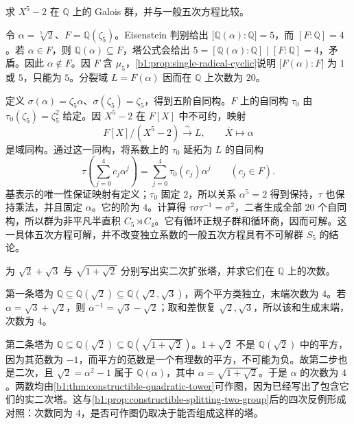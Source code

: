 \begin{exercise}\label{b1:ex:21-10}
	求 \(X^5-2\) 在 \(\mathbb Q\) 上的 Galois 群，并与一般五次方程比较。
\end{exercise}
\begin{solution}
	令 \(\alpha=\sqrt[5]{2}\)、\(F=\mathbb Q(\zeta_5)\)。Eisenstein 判别给出 \(\bigl[\mathbb Q(\alpha):\mathbb Q\bigr]=5\)，而 \([F:\mathbb Q]=4\)。若 \(\alpha\in F\)，则 \(\mathbb Q(\alpha)\subseteq F\)，塔公式会给出 \(5=[\mathbb Q(\alpha):\mathbb Q]\mid[F:\mathbb Q]=4\)，矛盾。因此 \(\alpha\notin F\)。因 \(F\) 含 \(\mu_5\)，\cref{b1:prop:single-radical-cyclic}说明 \(\bigl[F(\alpha):F\bigr]\) 为 \(1\) 或 \(5\)，只能为 \(5\)。分裂域 \(L=F(\alpha)\) 因而在 \(\mathbb Q\) 上次数为 \(20\)。

	定义 \(\sigma(\alpha)=\zeta_5\alpha\)、\(\sigma(\zeta_5)=\zeta_5\)，得到五阶自同构。\(F\) 上的自同构 \(\tau_0\) 由 \(\tau_0(\zeta_5)=\zeta_5^2\) 给定。因 \(X^5-2\) 在 \(F[X]\) 中不可约，映射
	\[
		F[X]/(X^5-2)\xrightarrow{\ \sim\ }L,\qquad \overline X\longmapsto\alpha
	\]
	是域同构。通过这一同构，将系数上的 \(\tau_0\) 延拓为 \(L\) 的自同构
	\[
		\tau\!\left(\sum_{j=0}^4c_j\alpha^j\right) =\sum_{j=0}^4\tau_0(c_j)\alpha^j\qquad(c_j\in F).
	\]
	基表示的唯一性保证映射有定义；\(\tau_0\) 固定 \(2\)，所以关系 \(\alpha^5=2\) 得到保持，\(\tau\) 也保持乘法，并且固定 \(\alpha\)。它的阶为 \(4\)。计算得 \(\tau\sigma\tau^{-1}=\sigma^2\)，二者生成全部 \(20\) 个自同构，所以群为非平凡半直积 \(C_5\rtimes C_4\)。它有循环正规子群和循环商，因而可解。这一具体五次方程可解，并不改变独立系数的一般五次方程具有不可解群 \(S_5\) 的结论。
\end{solution}

\begin{exercise}\label{b1:ex:21-11}
	为 \(\sqrt2+\sqrt3\) 与 \(\sqrt{1+\sqrt2}\) 分别写出实二次扩张塔，并求它们在 \(\mathbb Q\) 上的次数。
\end{exercise}
\begin{solution}
	第一条塔为 \(\mathbb Q\subseteq\mathbb Q(\sqrt2)\subseteq\mathbb Q(\sqrt2,\sqrt3)\)，两个平方类独立，末端次数为 \(4\)。若 \(\alpha=\sqrt3+\sqrt2\)，则 \(\alpha^{-1}=\sqrt3-\sqrt2\)；取和差恢复 \(\sqrt2,\sqrt3\)，所以该和生成末端，次数为 \(4\)。

	第二条塔为 \(\mathbb Q\subseteq\mathbb Q(\sqrt2)\subseteq\mathbb Q(\sqrt{1+\sqrt2})\)。\(1+\sqrt2\) 不是 \(\mathbb Q(\sqrt2)\) 中的平方，因为其范数为 \(-1\)，而平方的范数是一个有理数的平方，不可能为负。故第二步也是二次，且 \(\sqrt2=\alpha^2-1\) 属于 \(\mathbb Q(\alpha)\)，其中 \(\alpha=\sqrt{1+\sqrt2}\)。于是 \(\alpha\) 的次数为 \(4\)。两数均由\cref{b1:thm:constructible-quadratic-tower}可作图，因为已经写出了包含它们的实二次塔。这与\cref{b1:prop:constructible-splitting-two-group}后的四次反例形成对照：次数同为 \(4\)，是否可作图仍取决于能否组成这样的塔。
\end{solution}

